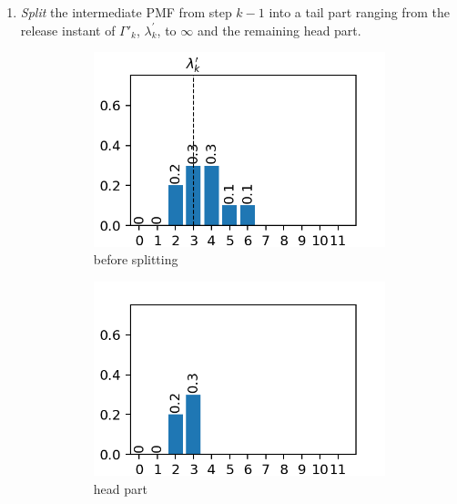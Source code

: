 \documentclass[a4paper,oneside]{csthesis}
\begin{document}
\begin{enumerate}
    \item \textit{Split} the intermediate PMF from step $k-1$ into a tail part ranging from the release instant of $\Gamma'_k$, $\lambda^\prime_k$, to $\infty$ and the remaining head part.
    \begin{figure}[h]
    \centering
        \begin{subfigure}[c]{0.3\textwidth}
            \includegraphics[width=\textwidth]{figures/ex_split_1a.png}
            \caption{before splitting}
        \end{subfigure}
        \begin{subfigure}[c]{0.3\textwidth}
            \includegraphics[width=\textwidth]{figures/ex_split_1b.png}
            \caption{head part}
        \end{subfigure}
        \begin{subfigure}[c]{0.3\textwidth}

\end{subfigure}
\end{figure}
\end{enumerate}
\end{document}
